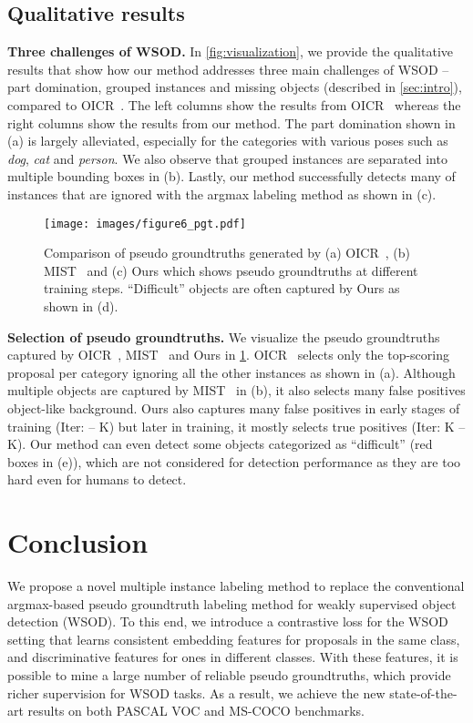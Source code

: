 \documentclass[runningheads]{llncs}
\begin{document}
\subsection{Qualitative results}
\noindent\textbf{Three challenges of WSOD.} In \cref{fig:visualization}, we provide the qualitative results that show how our method addresses three main challenges of WSOD -- part domination, grouped instances and missing objects (described in \cref{sec:intro}), compared to OICR~\cite{Tang_2017_CVPR}.
The left columns show the results from OICR~\cite{Tang_2017_CVPR} whereas the right columns show the results from our method.
The part domination shown in (a) is largely alleviated, especially for the categories with various poses such as \textit{dog}, \textit{cat} and \textit{person}.
We also observe that grouped instances are separated into multiple bounding boxes in (b).
Lastly, our method successfully detects many of instances that are ignored with the argmax labeling method as shown in (c).


\begin{figure}[t]
\centering
\texttt{[image: images/figure6\_pgt.pdf]}
\caption{
Comparison of pseudo groundtruths generated by (a) OICR~\cite{Tang_2017_CVPR}, (b) MIST~\cite{ren2020instance} and (c) Ours which shows pseudo groundtruths at different training steps.
``Difficult'' objects are often captured by Ours as shown in (d).}
\label{fig:figure6_pgt}
\end{figure}
\noindent\textbf{Selection of pseudo groundtruths.}
We visualize the pseudo groundtruths captured by OICR~\cite{Tang_2017_CVPR}, MIST~\cite{ren2020instance} and Ours in \cref{fig:figure6_pgt}.
OICR~\cite{Tang_2017_CVPR} selects only the top-scoring proposal per category ignoring all the other instances as shown in (a).
Although multiple objects are captured by MIST~\cite{ren2020instance} in (b), it also selects many false positives \eg object-like background.
Ours also captures many false positives in early stages of training (Iter:  -- K) but later in training, it mostly selects true positives (Iter: K -- K).
Our method can even detect some objects categorized as ``difficult'' (red boxes in (e)), which are not considered for detection performance as they are too hard even for humans to detect.

\section{Conclusion}
We propose a novel multiple instance labeling method to replace the conventional argmax-based pseudo groundtruth labeling method for weakly supervised object detection (WSOD).
To this end, we introduce a contrastive loss for the WSOD setting that learns consistent embedding features for proposals in the same class, and discriminative features for ones in different classes.
With these features, it is possible to mine a large number of reliable pseudo groundtruths, which provide richer supervision for WSOD tasks.
As a result, we achieve the new state-of-the-art results on both PASCAL VOC and MS-COCO benchmarks.
\end{document}
